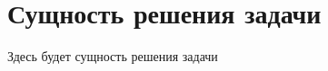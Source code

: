 \renewcommand{\chaptertitle}{Сущность решения задачи}  %
\chapter{\chaptertitle}\label{ch:ch5}

Здесь будет сущность решения задачи